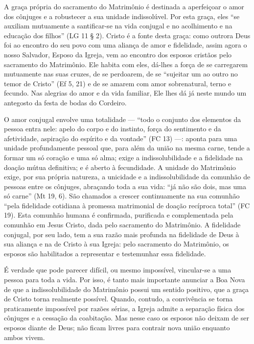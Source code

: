 A graça própria do sacramento do Matrimônio é destinada a aperfeiçoar o amor dos cônjuges e a robustecer a sua unidade indissolúvel. Por esta graça, eles ``se auxiliam mutuamente a santificar-se na vida conjugal e no acolhimento e na educação dos filhos'' (LG 11 § 2). Cristo é a fonte desta graça: como outrora Deus foi ao encontro do seu povo com uma aliança de amor e fidelidade, assim agora o nosso Salvador, Esposo da Igreja, vem ao encontro dos esposos cristãos pelo sacramento do Matrimônio. Ele habita com eles, dá-lhes a força de se carregarem mutuamente nas suas cruzes, de se perdoarem, de se ``sujeitar um ao outro no temor de Cristo'' (Ef 5, 21) e de se amarem com amor sobrenatural, terno e fecundo. Nas alegrias do amor e da vida familiar, Ele lhes dá já neste mundo um antegosto da festa de bodas do Cordeiro.

O amor conjugal envolve uma totalidade --- ``todo o conjunto dos elementos da pessoa entra nele: apelo do corpo e do instinto, força do sentimento e da afetividade, aspiração do espírito e da vontade'' (FC 13) ---: aponta para uma unidade profundamente pessoal que, para além da união na mesma carne, tende a formar um só coração e uma só alma; exige a indissolubilidade e a fidelidade na doação mútua definitiva; e é aberto à fecundidade. A unidade do Matrimônio exige, por sua própria natureza, a unicidade e a indissolubilidade da comunhão de pessoas entre os cônjuges, abraçando toda a sua vida: ``já não são dois, mas uma só carne'' (Mt 19, 6). São chamados a crescer continuamente na sua comunhão ``pela fidelidade cotidiana à promessa matrimonial de doação recíproca total'' (FC 19). Esta comunhão humana é confirmada, purificada e complementada pela comunhão em Jesus Cristo, dada pelo sacramento do Matrimônio. A fidelidade conjugal, por seu lado, tem a sua razão mais profunda na fidelidade de Deus à sua aliança e na de Cristo à sua Igreja: pelo sacramento do Matrimônio, os esposos são habilitados a representar e testemunhar essa fidelidade.

É verdade que pode parecer difícil, ou mesmo impossível, vincular-se a uma pessoa para toda a vida. Por isso, é tanto mais importante anunciar a Boa Nova de que a indissolubilidade do Matrimônio possui um sentido positivo, que a graça de Cristo torna realmente possível. Quando, contudo, a convivência se torna praticamente impossível por razões sérias, a Igreja admite a separação física dos cônjuges e a cessação da coabitação. Mas nesse caso os esposos não deixam de ser esposos diante de Deus; não ficam livres para contrair nova união enquanto ambos vivem.

